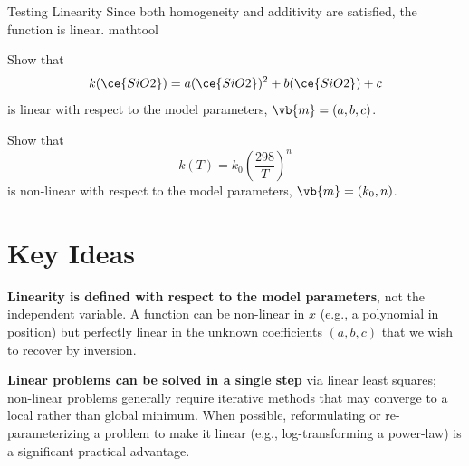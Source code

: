 \begin{activity}{Testing Linearity}
{Since both homogeneity and additivity are satisfied, the function is linear.
}{mathtool}

\begin{questions}
    Show that
    \[
        k(\ce{SiO2}) = a (\ce{SiO2})^2 + b (\ce{SiO2}) + c
    \]
    is linear with respect to the model parameters, $\vb{m} = (a,b,c)$.
    \answerbox[30em]

    Show that 
    \[
        k(T) = k_0 \left( \frac{298}{T} \right)^n
    \]
    is non-linear with respect to the model parameters, $\vb{m} = (k_0,n)$.
    \answerbox[30em]

    \answerbox

\end{questions}

\section*{Key Ideas}

\textbf{Linearity is defined with respect to the model parameters}, not the independent variable. A function can be non-linear in $x$ (e.g., a polynomial in position) but perfectly linear in the unknown coefficients $(a, b, c)$ that we wish to recover by inversion.

\textbf{Linear problems can be solved in a single step} via linear least squares; non-linear problems generally require iterative methods that may converge to a local rather than global minimum. When possible, reformulating or re-parameterizing a problem to make it linear (e.g., log-transforming a power-law) is a significant practical advantage.

\end{activity}